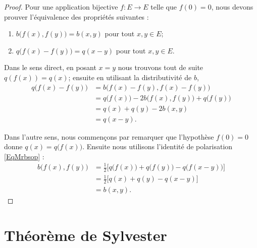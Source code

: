 \begin{proof}
    Pour une application bijective \( f\colon E\to E\) telle que \( f(0)=0\), nous devons prouver l'équivalence des propriétés suivantes :
    \begin{enumerate}
        \item
            \( b\big( f(x),f(y) \big)=b(x,y)\) pour tout \( x,y\in E\);
        \item
            \( q\big( f(x)-f(y) \big)=q(x-y)\) pour tout \( x,y\in E\).
    \end{enumerate}

    Dans le sens direct, en posant \( x=y\) nous trouvons tout de suite \( q(f(x))=q(x)\); ensuite en utilisant la distributivité de \( b\),
    \begin{subequations}
        \begin{align}
            q\big( f(x)-f(y) \big)&=b\big( f(x)-f(y),f(x)-f(y) \big)\\
            &=q\big( f(x) \big)-2b\big( f(x),f(y) \big)+q\big( f(y) \big)\\
            &=q(x)+q(y)-2b(x,y)\\
            &=q(x-y).
        \end{align}
    \end{subequations}

    Dans l'autre sens, nous commençons par remarquer que l'hypothèse \( f(0)=0\) donne \( q(x)=q\big( f(x) \big)\). Ensuite nous utilisons l'identité de polarisation \eqref{EqMrbsop} :
    \begin{subequations}
        \begin{align}
            b\big( f(x),f(y) \big)&=\frac{ 1 }{2}\big[ q\big( f(x) \big)+q\big( f(y) \big)-q\big( f(x-y) \big) \big]\\
            &=\frac{ 1 }{2}\big[ q(x)+q(y)-q(x-y) \big]\\
            &=b(x,y).
        \end{align}
    \end{subequations}
\end{proof}


\section{Théorème de Sylvester}

